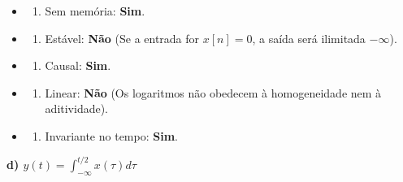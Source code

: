 \begin{itemize}
\tightlist
\item
  \begin{enumerate}
  \def\labelenumi{(\roman{enumi})}
  \tightlist
  \item
    Sem memória: \textbf{Sim}.
  \end{enumerate}
\item
  \begin{enumerate}
  \def\labelenumi{(\roman{enumi})}
  \setcounter{enumi}{1}
  \tightlist
  \item
    Estável: \textbf{Não} (Se a entrada for \(x[n] = 0\), a saída será ilimitada \(-\infty\)).
  \end{enumerate}
\item
  \begin{enumerate}
  \def\labelenumi{(\roman{enumi})}
  \setcounter{enumi}{2}
  \tightlist
  \item
    Causal: \textbf{Sim}.
  \end{enumerate}
\item
  \begin{enumerate}
  \def\labelenumi{(\roman{enumi})}
  \setcounter{enumi}{3}
  \tightlist
  \item
    Linear: \textbf{Não} (Os logaritmos não obedecem à homogeneidade nem à aditividade).
  \end{enumerate}
\item
  \begin{enumerate}
  \def\labelenumi{(\alph{enumi})}
  \setcounter{enumi}{21}
  \tightlist
  \item
    Invariante no tempo: \textbf{Sim}.
  \end{enumerate}
\end{itemize}

\textbf{d) \(y(t) = \int_{-\infty}^{t/2} x(\tau) d\tau\)}


